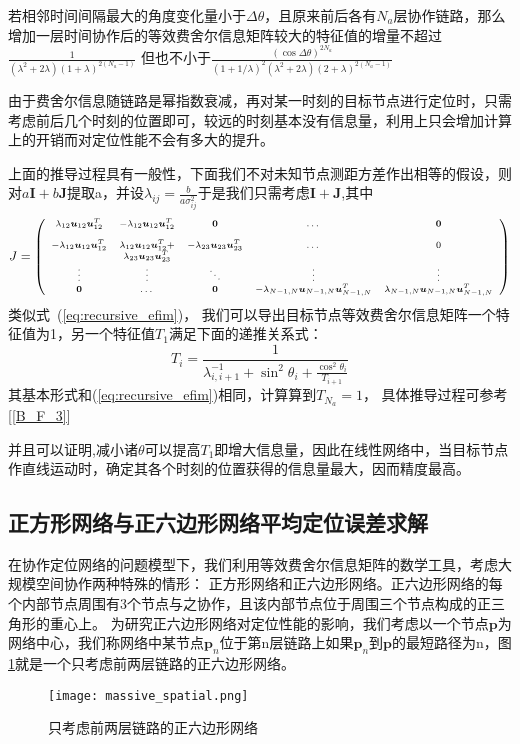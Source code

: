 \begin{theorem}
若相邻时间间隔最大的角度变化量小于$\Delta \theta$，且原来前后各有$N_a$层协作链路，那么增加一层时间协作后的等效费舍尔信息矩阵较大的特征值的增量不超过
$\frac{1}{(\lambda^2+2\lambda)(1+\lambda)^{2(N_a-1)}}$
但也不小于$\frac{(\cos\Delta\theta)^{2N_a}}{(1+1/\lambda)^2(\lambda^2+2\lambda)(2+\lambda)^{2(N_a-1)}}$
\end{theorem}
\begin{remark}
由于费舍尔信息随链路是幂指数衰减，再对某一时刻的目标节点进行定位时，只需考虑前后几个时刻的位置即可，较远的时刻基本没有信息量，利用上只会增加计算上的开销而对定位性能不会有多大的提升。
\end{remark}
上面的推导过程具有一般性，下面我们不对未知节点测距方差作出相等的假设，则对$a\bm{I}+b\bm{J}$提取a，并设$\lambda_{ij}=\frac{b}{a\sigma_{ij}^2}$于是我们只需考虑$\bm{I}+\bm{J}$,其中
\[\scriptsize{
J=\left(
\begin{array}{ccccc}
\lambda_{12}\bm{u}_{12}\bm{u}_{12}^T&-\lambda_{12}\bm{u}_{12}\bm{u}_{12}^T&\bm{0}&\dots&\bm{0}\\
&&&&\\
-\lambda_{12}\bm{u}_{12}\bm{u}_{12}^T&\lambda_{12}\bm{u}_{12}\bm{u}_{12}^T+&-\lambda_{23}\bm{u}_{23}\bm{u}_{23}^T&\dots&0\\
&\lambda_{23}\bm{u}_{23}\bm{u}_{23}^T&&&\\
\vdots &\vdots&\ddots &\vdots&\vdots\\
\bm{0}&\dots&\bm{0}&-\lambda_{N-1,N}\bm{u}_{N-1,N}\bm{u}_{N-1,N}^T&\lambda_{N-1,N}\bm{u}_{N-1,N}\bm{u}_{N-1,N}^T\\
\end{array}
\right)}
\]
类似式~(\ref{eq:recursive_efim})，
我们可以导出目标节点等效费舍尔信息矩阵一个特征值为1，另一个特征值$T_1$满足下面的递推关系式：
\begin{equation}\label{eq:recursive_efim_second}
  T_i=\frac{1}{\lambda_{i,i+1}^{-1}+\sin^2\theta_i+\frac{\cos^2\theta_i}{T_{i+1}}}
\end{equation}
其基本形式和(\ref{eq:recursive_efim})相同，计算算到$T_{N_a}=1$，
具体推导过程可参考[\ref{B_F_3}]

并且可以证明,减小诸$\theta$可以提高$T_1$即增大信息量，因此在线性网络中，当目标节点作直线运动时，确定其各个时刻的位置获得的信息量最大，因而精度最高。
\subsection{正方形网络与正六边形网络平均定位误差求解}\label{subsection:square_and_hexagon_network}
在协作定位网络的问题模型下，我们利用等效费舍尔信息矩阵的数学工具，考虑大规模空间协作两种特殊的情形：
正方形网络和正六边形网络。正六边形网络的每个内部节点周围有3个节点与之协作，且该内部节点位于周围三个节点构成的正三角形的重心上。
为研究正六边形网络对定位性能的影响，我们考虑以一个节点$\bm{p}$为网络中心，我们称网络中某节点$\bm{p}_n$位于第n层链路上如果$\bm{p}_n$到$\bm{p}$的最短路径为n，图\ref{HexagonNetwork}就是一个只考虑前两层链路的正六边形网络。
\begin{figure}[h]
  \centering
  \texttt{[image: massive\_spatial.png]}
  \caption{只考虑前两层链路的正六边形网络}\label{HexagonNetwork}
\end{figure}

